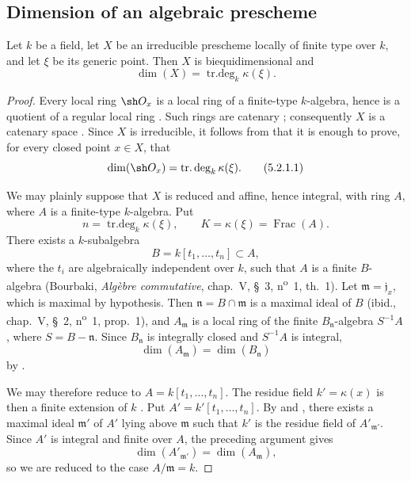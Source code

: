 \subsection{Dimension of an algebraic prescheme}
\label{subsection:IV.5.2}


\begin{proposition}[5.2.1]
\label{IV.5.2.1}
Let $k$ be a field, let $X$ be an irreducible prescheme locally of
finite type over $k$, and let $\xi$ be its generic point.
Then $X$ is biequidimensional and
\[
\dim(X)=\operatorname{tr.deg}_k\kappa(\xi).
\]
\end{proposition}

\begin{proof}
Every local ring $\sh O_x$ is a local ring of a finite-type
$k$-algebra, hence is a quotient of a regular local ring
.
Such rings are catenary ; consequently $X$ is a
catenary space .
Since $X$ is irreducible, it follows from  that it is
enough to prove, for every closed point $x\in X$, that
\begin{equation}
\dim(\sh O_x)=\operatorname{tr.deg}_k\kappa(\xi).
\tag{5.2.1.1}\label{IV.5.2.1.1}
\end{equation}

We may plainly suppose that $X$ is reduced and affine, hence integral,
with ring $A$, where $A$ is a finite-type $k$-algebra.
Put
\[
n=\operatorname{tr.deg}_k\kappa(\xi),
\qquad K=\kappa(\xi)=\operatorname{Frac}(A).
\]
There exists a $k$-subalgebra
\[
B=k[t_1,\ldots,t_n]\subset A,
\]
where the $t_i$ are algebraically independent over $k$, such that $A$
is a finite $B$-algebra
(Bourbaki, \emph{Alg\`ebre commutative}, chap.~V, \S~3,
n\textsuperscript{o}~1, th.~1).
Let $\mathfrak m=\mathfrak j_x$, which is maximal by hypothesis.
Then $\mathfrak n=B\cap\mathfrak m$ is a maximal ideal of $B$
(ibid., chap.~V, \S~2, n\textsuperscript{o}~1, prop.~1), and
$A_{\mathfrak m}$ is a local ring of the finite
$B_{\mathfrak n}$-algebra $S^{-1}A$, where
$S=B-\mathfrak n$.
Since $B_{\mathfrak n}$ is integrally closed and $S^{-1}A$ is
integral,
\[
\dim(A_{\mathfrak m})=\dim(B_{\mathfrak n})
\]
by .

We may therefore reduce to $A=k[t_1,\ldots,t_n]$.
The residue field $k'=\kappa(x)$ is then a finite extension of $k$
.
Put $A'=k'[t_1,\ldots,t_n]$.
By  and , there exists a maximal
ideal $\mathfrak m'$ of $A'$ lying above $\mathfrak m$ such that $k'$
is the residue field of $A'_{\mathfrak m'}$.
Since $A'$ is integral and finite over $A$, the preceding argument
gives
\[
\dim(A'_{\mathfrak m'})=\dim(A_{\mathfrak m}),
\]
so we are reduced to the case $A/\mathfrak m=k$.


\end{proof}

